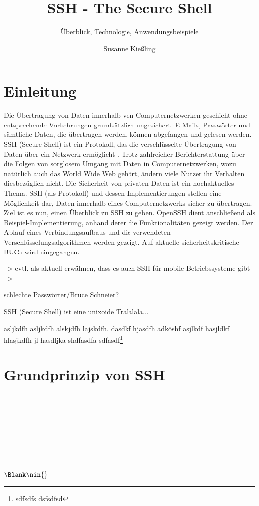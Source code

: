\documentclass[ngerman,pdf]{wkcms}    %
\title{SSH - The Secure Shell}
\subtitle{Überblick, Technologie, Anwendungsbeispiele}
\author{Susanne Kießling}
\date{\todaylong}
\begin{document}
\maketitle


\section{Einleitung}

Die Übertragung von Daten innerhalb von Computernetzwerken geschieht ohne
entsprechende Vorkehrungen grundsätzlich ungesichert. E-Mails, Passwörter und sämtliche Daten, die übertragen werden, können abgefangen und gelesen werden. SSH (Secure Shell) ist ein Protokoll, das die verschlüsselte Übertragung von Daten über ein Netzwerk ermöglicht \cite{SSH}.
Trotz zahlreicher Berichterstattung über die Folgen von sorglosem Umgang mit Daten in Computernetzwerken, wozu natürlich auch das World Wide Web gehört, ändern viele Nutzer
ihr Verhalten diesbezüglich nicht. Die Sicherheit von privaten Daten ist ein hochaktuelles Thema. SSH (als Protokoll) und dessen Implementierungen stellen eine Möglichkeit dar, Daten innerhalb eines Computernetzwerks sicher zu übertragen. Ziel ist es nun, einen Überblick zu SSH zu geben. OpenSSH dient anschließend als Beispiel-Implementierung, anhand derer die Funktionalitäten gezeigt werden. Der Ablauf eines Verbindungsaufbaus und die verwendeten Verschlüsselungsalgorithmen werden gezeigt. Auf aktuelle sicherheitskritische BUGs wird eingegangen.

--> evtl. als aktuell erwähnen, dass es auch SSH für mobile Betriebssysteme gibt
--> 

 schlechte Passwörter/Bruce Schneier?
 

SSH (Secure Shell) ist eine unixoide \cite{knuthwebsite} Tralalala...


asljkdfh asljkdfh alskjdfh lajskdfh. dasdkf hjasdfh adköshf asjlkdf
hasjldkf hlasjkdfh jl hasdljka shdfasdfa sdfasdf\footnote{sdfsdfs dsfsdfsd}



\newpage

\section{Grundprinzip von SSH}
\bzgl \bzw \ca \Dh \evtl \etc \ggf \iAllg \oAe \uAe \usf \usw \vgl \zB \\
\cf \cp \ie \eg \etc \wrt \viz \vs \Wlog \\
 \\
  \\
 \\
 \\
  \\
 \\
 $\Blank \nin \{\}$
\end{document}
